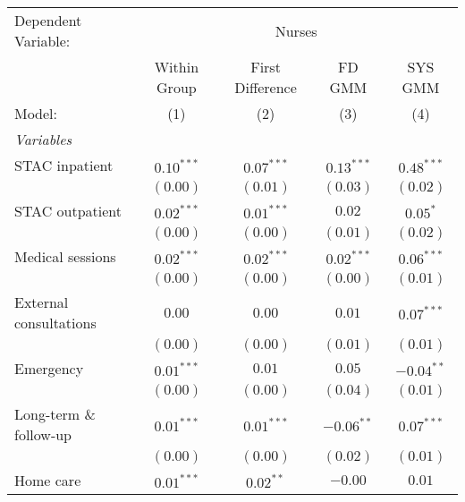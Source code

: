 
\begingroup
\centering
\begin{tabular}{lcccc}
   \tabularnewline \midrule \midrule
   Dependent Variable:    & \multicolumn{4}{c}{Nurses}                                                  \\
                          & Within Group               & First Difference & FD GMM       & SYS GMM      \\
   Model:                 & (1)                        & (2)              & (3)          & (4)          \\
   \midrule
   \emph{Variables}                                                                                     \\
   STAC inpatient         & $0.10^{***}$               & $0.07^{***}$     & $0.13^{***}$ & $0.48^{***}$ \\
                          & $(0.00)$                   & $(0.01)$         & $(0.03)$     & $(0.02)$     \\
   STAC outpatient        & $0.02^{***}$               & $0.01^{***}$     & $0.02$       & $0.05^{*}$   \\
                          & $(0.00)$                   & $(0.00)$         & $(0.01)$     & $(0.02)$     \\
   Medical sessions       & $0.02^{***}$               & $0.02^{***}$     & $0.02^{***}$ & $0.06^{***}$ \\
                          & $(0.00)$                   & $(0.00)$         & $(0.00)$     & $(0.01)$     \\
   External consultations & $0.00$                     & $0.00$           & $0.01$       & $0.07^{***}$ \\
                          & $(0.00)$                   & $(0.00)$         & $(0.01)$     & $(0.01)$     \\
   Emergency              & $0.01^{***}$               & $0.01$           & $0.05$       & $-0.04^{**}$ \\
                          & $(0.00)$                   & $(0.00)$         & $(0.04)$     & $(0.01)$     \\
   Long-term \& follow-up & $0.01^{***}$               & $0.01^{***}$     & $-0.06^{**}$ & $0.07^{***}$ \\
                          & $(0.00)$                   & $(0.00)$         & $(0.02)$     & $(0.01)$     \\
   Home care              & $0.01^{***}$               & $0.02^{**}$      & $-0.00$      & $0.01$       \\

\end{tabular}
